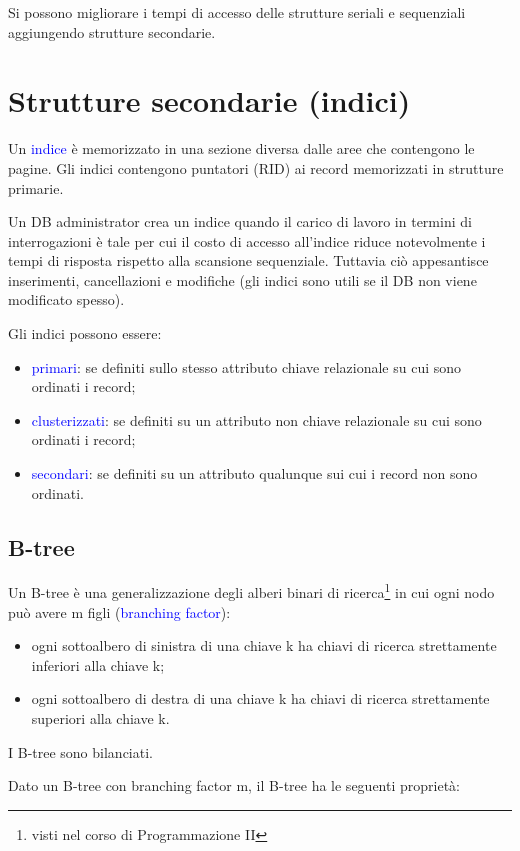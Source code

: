 Si possono migliorare i tempi di accesso delle strutture seriali e sequenziali aggiungendo strutture secondarie.

\section{Strutture secondarie (indici)}
\label{Indici}
Un \textcolor{blue}{indice} è memorizzato in una sezione diversa dalle aree che contengono le pagine. Gli indici contengono puntatori (RID) ai record memorizzati in strutture primarie.

Un DB administrator crea un indice quando il carico di lavoro in termini di interrogazioni è tale per cui il costo di accesso all’indice riduce notevolmente i tempi di risposta rispetto alla scansione sequenziale. Tuttavia ciò appesantisce inserimenti, cancellazioni e modifiche (gli indici sono utili se il DB non viene modificato spesso).

Gli indici possono essere:
\begin{itemize}
    \item \textcolor{blue}{primari}: se definiti sullo stesso attributo chiave relazionale su cui sono ordinati i record;
    \item \textcolor{blue}{clusterizzati}: se definiti su un attributo non chiave relazionale su cui sono ordinati i record;
    \item \textcolor{blue}{secondari}: se definiti su un attributo qualunque sui cui i record non sono ordinati.
\end{itemize}

\subsection{B-tree}

Un B-tree è una generalizzazione degli alberi binari di ricerca\footnote{visti nel corso di Programmazione II} in cui ogni nodo può avere m figli (\textcolor{blue}{branching factor}):
\begin{itemize}
    \item ogni sottoalbero di sinistra di una chiave k ha chiavi di ricerca strettamente inferiori alla chiave k;
    \item ogni sottoalbero di destra di una chiave k ha chiavi di ricerca strettamente superiori alla chiave k.
\end{itemize}

I B-tree sono bilanciati.

Dato un B-tree con branching factor m, il B-tree ha le seguenti proprietà:

